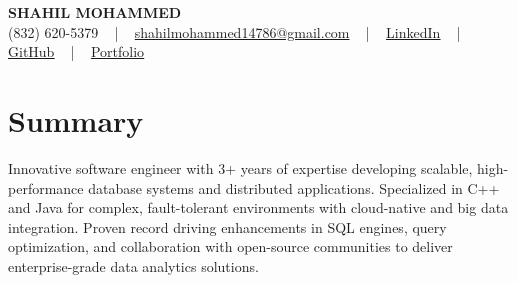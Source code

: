 \documentclass[letterpaper,10pt]{article}
\begin{document}
\begin{center}
    {\fontsize{14pt}{12pt}\selectfont \textbf{\MakeUppercase{Shahil Mohammed}}}\\ \vspace{2pt}
    \fontsize{10pt}{12pt}\selectfont (832) 620-5379 ~ | ~ \href{mailto:shahilmohammed14786@gmail.com}{shahilmohammed14786@gmail.com} ~ | ~  
    \href{https://www.linkedin.com/in/shahil-mohammed-9652931a1/}{\color{blue}\underline{LinkedIn}}  ~ | ~ 
    \href{https://github.com/freakbeast14}{\color{blue}\underline{GitHub}} ~ | ~ 
    \href{https://shahil-mohammed.netlify.app/}{\color{blue}\underline{Portfolio}}
    \vspace{-8pt}
\end{center}

\section{Summary}
\vspace{-2pt}\fontsize{8pt}{9pt}\selectfont
Innovative software engineer with 3+ years of expertise developing scalable, high-performance database systems and distributed applications. Specialized in C++ and Java for complex, fault-tolerant environments with cloud-native and big data integration. Proven record driving enhancements in SQL engines, query optimization, and collaboration with open-source communities to deliver enterprise-grade data analytics solutions.
 \vspace{-5pt}
 
\vspace{-2pt}
\end{document}
